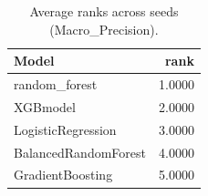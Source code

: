 \begin{table}[t]
\centering
\begin{tabular}{lr}
\toprule
Model & rank \\
\midrule
random_forest & 1.0000 \\
XGBmodel & 2.0000 \\
LogisticRegression & 3.0000 \\
BalancedRandomForest & 4.0000 \\
GradientBoosting & 5.0000 \\
\bottomrule
\end{tabular}
\caption{Average ranks across seeds (Macro_Precision).}
\label{tab:avg_rank_Macro_Precision}
\end{table}